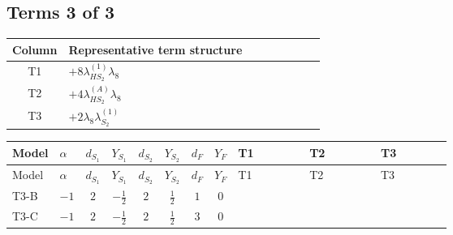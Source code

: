 \documentclass[8pt]{article}
\begin{document}
\begin{landscape}
\subsection*{Terms 3 of 3}
\begin{center}
\begin{tabular}{@{}c >{\raggedright\arraybackslash}p{0.82\linewidth}@{}}
\toprule
Column & Representative term structure \\
\midrule
T1 & \(\displaystyle +8 {\lambda_{HS_2}^{(1)}} {\lambda_8}\) \\
\midrule
T2 & \(\displaystyle +4 {\lambda_{HS_2}^{(A)}} {\lambda_8}\) \\
\midrule
T3 & \(\displaystyle +2 {\lambda_8} {\lambda_{S_2}^{(1)}}\) \\
\midrule
\bottomrule
\end{tabular}
\end{center}
\smallskip
\tiny
\begin{longtable}{@{}llcccccc >{\raggedright\arraybackslash}p{0.21\linewidth} >{\raggedright\arraybackslash}p{0.21\linewidth} >{\raggedright\arraybackslash}p{0.21\linewidth}@{}}
\toprule
Model & $\alpha$ & $d_{S_1}$ & $Y_{S_1}$ & $d_{S_2}$ & $Y_{S_2}$ & $d_F$ & $Y_F$ & T1 & T2 & T3 \\
\midrule
\endfirsthead
\toprule
Model & $\alpha$ & $d_{S_1}$ & $Y_{S_1}$ & $d_{S_2}$ & $Y_{S_2}$ & $d_F$ & $Y_F$ & T1 & T2 & T3 \\
\midrule
\endhead
T3-B & $-1$ & $2$ & $-\frac{1}{2}$ & $2$ & $\frac{1}{2}$ & $1$ & $0$ & \scriptsize\adjustbox{max width=\linewidth}{$\begin{gathered} +8 {\lambda_{HS_2}^{(1)}} {\lambda_8}\end{gathered}$} & \scriptsize\adjustbox{max width=\linewidth}{$\begin{gathered} +4 {\lambda_{HS_2}^{(A)}} {\lambda_8}\end{gathered}$} & \scriptsize\adjustbox{max width=\linewidth}{$\begin{gathered} +2 {\lambda_8} {\lambda_{S_2}^{(1)}}\end{gathered}$} \\
\midrule
T3-C & $-1$ & $2$ & $-\frac{1}{2}$ & $2$ & $\frac{1}{2}$ & $3$ & $0$ & \scriptsize\adjustbox{max width=\linewidth}{$\begin{gathered} +8 {\lambda_{HS_2}^{(1)}} {\lambda_8}\end{gathered}$} & \scriptsize\adjustbox{max width=\linewidth}{$\begin{gathered} +4 {\lambda_{HS_2}^{(A)}} {\lambda_8}\end{gathered}$} & \scriptsize\adjustbox{max width=\linewidth}{$\begin{gathered} +2 {\lambda_8} {\lambda_{S_2}^{(1)}}\end{gathered}$} \\

\end{longtable}
\end{landscape}
\end{document}
